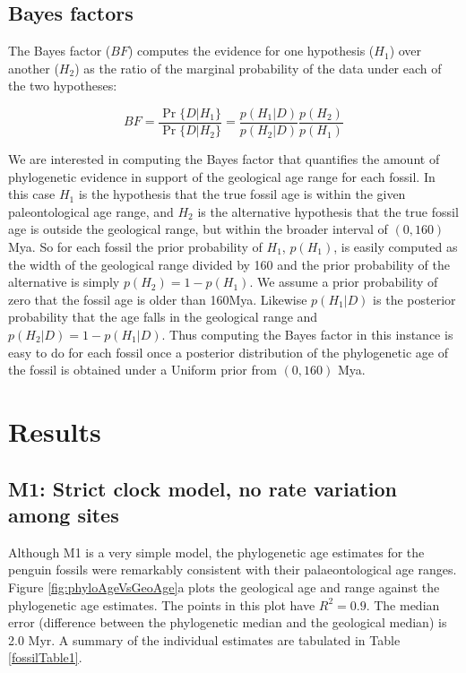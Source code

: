 \documentclass[11pt]{article}
\newcommand{\Mstrict}{{M1}}
\begin{document}
\subsection*{Bayes factors}

The Bayes factor ($BF$) computes the evidence for one hypothesis ($H_1$) over another ($H_2$) as the ratio of the marginal probability of the data under each of the two hypotheses:

\begin{equation}
BF = \frac{\Pr\{D|H_1\}}{\Pr\{D|H_2\}} = \frac{p(H_1|D)}{p(H_2|D)}\frac{p(H_2)}{p(H_1)}
\end{equation}

We are interested in computing the Bayes factor that quantifies the amount of phylogenetic evidence in support of the geological age range for each fossil. In this case $H_1$ is the hypothesis that the true fossil age is within the given paleontological age range, and $H_2$ is the alternative hypothesis that the true fossil age is outside the geological range, but within the broader interval of $(0,160)$ Mya. So for each fossil the prior probability of $H_1$, $p(H_1)$, is easily computed as the width of the geological range divided by 160 and the prior probability of the alternative is simply $p(H_2) = 1 - p(H_1)$. We assume a prior probability of zero that the fossil age is older than 160Mya. Likewise $p(H_1 | D)$ is the posterior probability that the age falls in the geological range and $p(H_2 | D) = 1 - p(H_1 | D)$. Thus computing the Bayes factor in this instance is easy to do for each fossil once a posterior distribution of the phylogenetic age of the fossil is obtained under a Uniform prior from $(0,160)$ Mya.

\section*{Results}


\subsection*{\Mstrict{}: Strict clock model, no rate variation among sites}
Although \Mstrict{} is a very simple model, the phylogenetic age estimates for the penguin fossils were remarkably consistent with their palaeontological age ranges. Figure \ref{fig:phyloAgeVsGeoAge}a plots the geological age and range against the phylogenetic age estimates. The points in this plot have $R^2 = 0.9$. The median error (difference between the phylogenetic median and the geological median) is 2.0 Myr. A summary of the individual estimates are tabulated in Table \ref{fossilTable1}.
\end{document}
